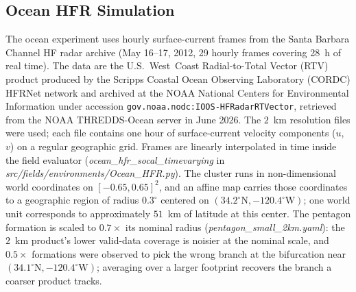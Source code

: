 \documentclass[12pt, letterpaper, oneside]{report}
\begin{document}
\subsection{Ocean HFR Simulation}
\label{sec:ocean_sim}

The ocean experiment uses hourly surface-current frames from the
Santa Barbara Channel HF radar archive (May 16--17, 2012, 29 hourly
frames covering 28~h of real time). The data are the U.S.~West~Coast
Radial-to-Total Vector (RTV) product produced by the Scripps Coastal
Ocean Observing Laboratory (CORDC) HFRNet network and archived at the
NOAA National Centers for Environmental Information under accession
\texttt{gov.noaa.nodc:IOOS-HFRadarRTVector}, retrieved from the NOAA
THREDDS-Ocean server in June 2026. The $2$~km resolution files were
used; each file contains one hour of surface-current velocity
components ($u$, $v$) on a regular geographic grid. Frames are
linearly interpolated in time inside the field evaluator
(\textit{ocean\_hfr\_socal\_timevarying} in
\textit{src/fields/environments/Ocean\_HFR.py}). The cluster runs in
non-dimensional world coordinates on $[-0.65, 0.65]^2$, and an affine
map carries those coordinates to a geographic region of radius
$0.3^{\circ}$ centered on $(34.2^{\circ}\mathrm{N},
-120.4^{\circ}\mathrm{W})$; one world unit corresponds to
approximately $51$~km of latitude at this center. The pentagon
formation is scaled to $0.7\times$ its nominal radius
(\textit{pentagon\_small\_2km.yaml}): the $2$~km product's lower
valid-data coverage is noisier at the nominal scale, and
$0.5\times$ formations were observed to pick the wrong branch at the
bifurcation near $(34.1^{\circ}\mathrm{N}, -120.4^{\circ}\mathrm{W})$;
averaging over a larger footprint recovers the branch a coarser
product tracks.
\end{document}
